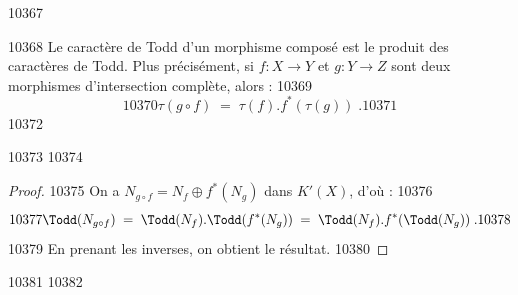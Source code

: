  10367	\begin{proposition}[3.4]%
 10368	Le caractère de Todd d'un morphisme composé est le produit des caractères de Todd. Plus précisément, si $f : X \to Y$ et $g : Y \to Z$ sont deux morphismes d'intersection complète, alors :
 10369	\[
 10370	\tau(g \circ f) \; = \; \tau(f) . f^*(\tau(g))\; .
 10371	\]
 10372	\end{proposition}
 10373	
 10374	\begin{proof}
 10375	On a $N_{g \circ f} = N_f \oplus f^*(N_g)$ dans $K'(X)$, d'où :
 10376	\[
 10377	\Todd(N_{g \circ f}) \; = \; \Todd(N_f) . \Todd(f^*(N_g)) \; = \; \Todd(N_f) . f^*(\Todd(N_g))\; .
 10378	\]
 10379	En prenant les inverses, on obtient le résultat.
 10380	\end{proof}
 10381	
 10382	
